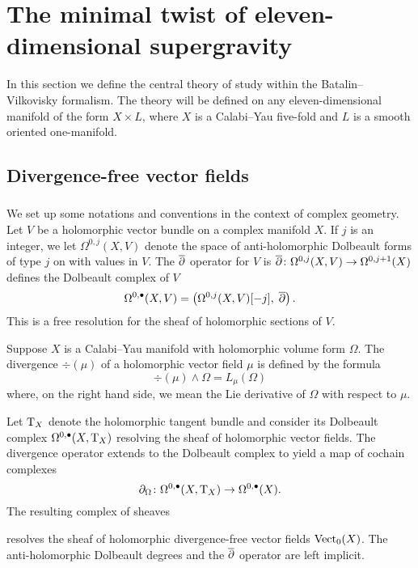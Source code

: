 \section{The minimal twist of eleven-dimensional supergravity} 
\label{s:dfn}

In this section we define the central theory of study within the Batalin--Vilkovisky formalism.
The theory will be defined on any eleven-dimensional manifold of the form $X \times L$, where $X$ is a Calabi--Yau five-fold and $L$ is a smooth oriented one-manifold.

\subsection{Divergence-free vector fields} 

\subsubsection{}
\label{sec:divfree}
We set up some notations and conventions in the context of complex geometry. 
Let $V$ be a holomorphic vector bundle on a complex manifold $X$. 
If $j$ is an integer, we let $\Omega^{0,j}(X, V)$ denote the space of anti-holomorphic Dolbeault forms of type $j$ on with values in $V$.
The $\overline{\partial}$ operator for $V$ is $\overline{\partial} \colon \Omega^{0,j}(X, V)\to \Omega^{0,j+1}(X)$ defines the Dolbeault complex of $V$
\[
  \Omega^{0,\bullet}(X, V) = \left(\Omega^{0,j}(X, V)[-j] , \; \overline{\partial}\right) .
\]
This is a free resolution for the sheaf of holomorphic sections of $V$.

Suppose $X$ is a Calabi--Yau manifold with holomorphic volume form $\Omega$.
The divergence $\div(\mu)$ of a holomorphic vector field $\mu$ is defined by the formula
\[
\div (\mu) \wedge \Omega = L_\mu (\Omega)
\]
where, on the right hand side, we mean the Lie derivative of $\Omega$ with respect to $\mu$.

Let ${\rm T}_X$ denote the holomorphic tangent bundle and consider its Dolbeault complex $\Omega^{0,\bullet}(X , {\rm T}_X)$ resolving the sheaf of holomorphic vector fields. 
The divergence operator extends to the Dolbeault complex to yield a map of cochain complexes 
\[
\partial_{\Omega} \colon \Omega^{0,\bullet}(X , {\rm T}_X) \to \Omega^{0,\bullet}(X) .
\]
The resulting complex of sheaves
\beqn\label{eqn:cplx1}
\eeqn
resolves the sheaf of holomorphic divergence-free vector fields ${\rm Vect}_0 (X)$.
The anti-holomorphic Dolbeault degrees and the $\overline{\partial}$ operator are left implicit. 

